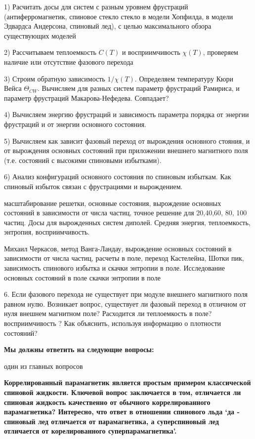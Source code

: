 \documentclass[utf8, babel, sor, jor, amsmath, amssymb, reprint]{elsarticle} %
\begin{document}
1) Расчитать досы для систем с разным уровнем фрустраций (антиферромагнетик, спиновое стекло стекло в модели Хопфилда, в модели Эдвардса Андерсона, спиновый лед), с целью максимального обзора существующих моделей

2) Рассчитываем теплоемкость $C(T)$ и восприимчивость $\chi(T)$, проверяем наличие или отсутствие фазового перехода

3) Строим обратную зависимость  $1/\chi(T)$. Определяем температуру Кюри Вейса $\Theta_{CW}$. Вычисляем для разных систем параметр фрустраций Рамириса, и параметр фрустраций Макарова-Нефедева. Совпадает?

4) Вычисляем энергию фрустраций и зависимость параметра порядка от энергии фрустраций и от энергии основного состояния. 

5) Вычисляем как зависит фазовый переход от вырождения основного стояния, и от вырождения основных состояний при приложении внешнего магнитного поля (т.е. состояний с высокими спиновыми избытками). 

6) Анализ конфигураций основного состояния по спиновым избыткам. Как спиновый избыток связан с фрустрациями и вырождением. 

масштабирование решетки, основные состояния, вырождение основных состояний в зависимости от числа частиц, точное решение для 20,40,60, 80, 100 частиц. Досы для вырожденных систем диполей. Средняя энергия, теплоемкость, энтропия, восприимчивость.

Михаил Черкасов, метод Ванга-Ландау, вырождение основных состояний в зависимости от числа частиц, расчеты в поле, переход Кастелейна, Шотки пик, зависимость спинового избытка и скачки энтропии в поле. Исследование основных состояний в поле скачки энтропии в поле

6. Если фазового перехода не существует при модуле внешнего магнитного поля равном нулю. Возникает вопрос, существует ли фазовый переход в отличном от нуля внешнем магнитном поле? Расходится ли теплоемкость в поле? восприимчивость ? Как объяснить, используя информацию о плотности состояний?  


\textbf{Мы должны ответить на следующие вопросы:}

один из главных вопросов

\textbf{Коррелированный парамагнетик
	является простым примером классической спиновой жидкости. Ключевой вопрос заключается в том, отличается ли спиновая жидкость
	качественно от обычного коррелированного парамагнетика? Интересно, что ответ в отношении спинового льда ‘да - спиновый лед отличается от парамагнетика, а суперспиновый лед отличается от корелированного суперпарамагнетика’.}
\end{document}
